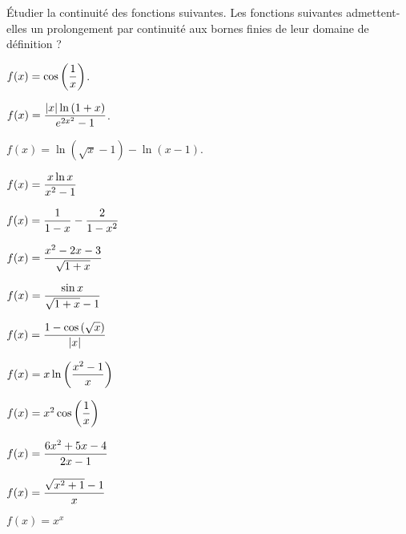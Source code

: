 \documentclass[a4paper, 11pt,reqno]{article}
\begin{document}
\begin{exercice}   \;
	\'Etudier la continuit\'e des fonctions suivantes. Les fonctions suivantes admettent-elles un prolongement par continuit\'e aux bornes finies de leur domaine de d\'efinition ?
	\begin{enumerate}
		\noindent \begin{minipage}[t]{0.45\textwidth}
			\item $f(x)=\cos{\left(\displaystyle\frac{1}{x}  \right)}$.
			\item $f(x)=\displaystyle\frac{|x| \ln{(1+x)}}{e^{2x^2}-1}$.
			\item $f(x)= \ln{\left(\sqrt{x}-1 \right)}-\ln{(x-1)}$.
			\item  $f(x)=\displaystyle\frac{x\ln{x}}{x^2-1}$
			\item $f(x)=\displaystyle\frac{1}{1-x}-\displaystyle\frac{2}{1-x^2}$
			\item $f(x)=\displaystyle\frac{x^2-2x-3}{\sqrt{1+x}}$
			\item $f(x)=\displaystyle\frac{\sin{x}}{\sqrt{1+x}-1}$
		\end{minipage}
		\begin{minipage}[t]{0.3\textwidth}
			\item $f(x)=\displaystyle\frac{1-\cos{(\sqrt{x})}}{|x|}$
			\item $f(x)=x\ln{\left(  \displaystyle\frac{x^2-1}{x} \right)}$
			\item $f(x)=x^2\cos{\left( \displaystyle\frac{1}{x} \right)}$
			\item $f(x)=\displaystyle\frac{6x^2+5x-4}{2x-1}$
			\item $f(x)=\displaystyle\frac{\sqrt{x^2+1}-1}{x}$
			\item $f(x)=x^x$
		\end{minipage}
	\end{enumerate}
\end{exercice}
\end{document}
